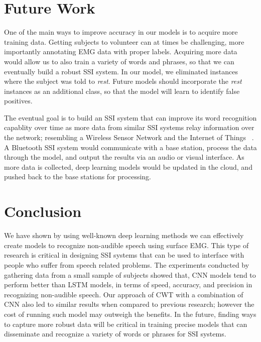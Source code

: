 \documentclass[conference]{IEEEtran}
\begin{document}
\section{Future Work}

One of the main ways to improve accuracy in our models is to acquire more training data. Getting subjects to volunteer can at times be challenging, more importantly annotating EMG data with proper labels. Acquiring more data would allow us to also train a variety of words and phrases, so that we can eventually build a robust SSI system. In our model, we eliminated instances where the subject was told to \textit{rest}. Future models should incorporate the \textit{rest} instances as an additional class, so that the model will learn to identify false positives.

The eventual goal is to build an SSI system that can improve its word recognition capablity over time as more data from similar SSI systems relay information over the network; resembling a Wireless Sensor Network and the Internet of Things ~\cite{ferdoush_wireless_2014}. A Bluetooth SSI system would communicate with a base station, process the data through the model, and output the results via an audio or visual interface. As more data is collected, deep learning models would be updated in the cloud, and pushed back to the base stations for processing. 
 
 
\section{Conclusion}

We have shown by using well-known deep learning methods we can effectively create models to recognize non-audible speech using surface EMG. This type of research is critical in designing SSI systems that can be used to interface with people who suffer from speech related problems. The experiments conducted by gathering data from a small sample of subjects showed that, CNN models tend to perform better than LSTM models, in terms of speed, accuracy, and precision in recognizing non-audible speech. Our approach of CWT with a combination of CNN also led to similar results when compared to previous research; however the cost of running such model may outweigh the benefits. In the future, finding ways to capture more robust data will be critical in training precise models that can disseminate and recognize a variety of words or phrases for SSI systems.
 
\end{document}
